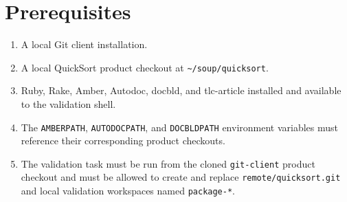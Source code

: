 \clearpage
\section{Prerequisites}
\begin{enumerate}
  \item A local Git client installation.

  \item A local QuickSort product checkout at \verb|~/soup/quicksort|.

  \item Ruby, Rake, Amber, Autodoc, docbld, and tlc-article installed and
    available to the validation shell.

  \item The \verb|AMBERPATH|, \verb|AUTODOCPATH|, and \verb|DOCBLDPATH|
    environment variables must reference their corresponding product checkouts.

  \item The validation task must be run from the cloned \verb|git-client|
    product checkout and must be allowed to create and replace
    \verb|remote/quicksort.git| and local validation workspaces named
    \verb|package-*|.

\end{enumerate}
